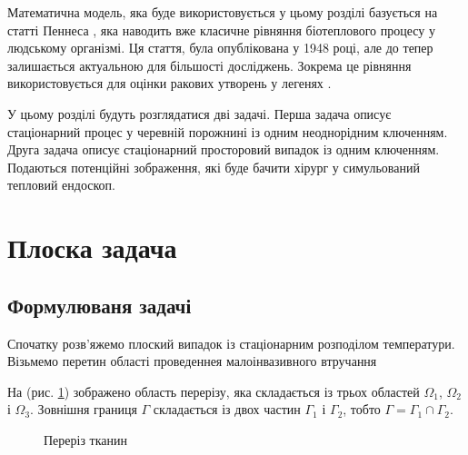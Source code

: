 Математична модель, яка буде використовується у цьому розділі базується на статті Пеннеса
\cite{thermal-process-tissue-pennes}, яка наводить вже класичне рівняння біотеплового процесу у людському організмі. Ця
стаття, була опублікована у 1948 році, але до тепер залишається актуальною для більшості досліджень. Зокрема це рівняння
використовується для оцінки ракових утворень у легенях \cite{lung-tumor-thermal-conductivity}.

У цьому розділі будуть розглядатися дві задачі. Перша задача описує стаціонарний процес у черевній порожнині із одним 
неоднорідним ключенням. Друга задача описує стаціонарний просторовий випадок із одним ключенням. Подаються потенційні 
зображення, які буде бачити хірург у симульований тепловий ендоскоп.

\section{Плоска задача}

\subsection{Формулюваня задачі}

Спочатку розв'яжемо плоский випадок із стаціонарним розподілом температури.
Візьмемо перетин області проведеннея малоінвазивного втручання

На (рис. \ref{fig:thermo_2d_domain}) зображено область перерізу, яка складається із трьох областей $\Omega_1$, 
$\Omega_2$ і $\Omega_3$. Зовнішня границя $\Gamma$ складається із двох частин $\Gamma_1$ і $\Gamma_2$, тобто 
$\Gamma=\Gamma_1\cap\Gamma_2$. 

\begin{figure}[ht!]
    \centering
    
    \caption{Переріз тканин}
    \label{fig:thermo_2d_domain}
\end{figure}

